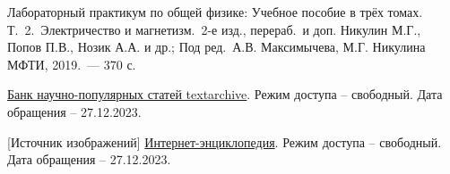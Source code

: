 \documentclass[a4paper, 14pt]{article}
\begin{document}
     {}
    \begin{thebibliography}{}
        
          Лабораторный практикум по общей физике: Учебное пособие в трёх томах.
        Т.~2.~Электричество и магнетизм.~2-е изд., перераб.~и доп.
        Никулин М.Г., Попов П.В., Нозик А.А. и др.; Под ред.~А.В. Максимычева, М.Г. Никулина
        МФТИ, 2019.~— 370 с.
        
         \href{https://textarchive.ru/}{Банк научно-популярных статей textarchive}.
        Режим доступа -- свободный.
        Дата обращения -- 27.12.2023.
        
         [Источник изображений] \href{https://ru.wikipedia.org/wiki/Оптическое_волокно}
        {Интернет-энциклопедия}.
        Режим доступа -- свободный.
        Дата обращения -- 27.12.2023.
    
    \end{thebibliography}
\end{document}
